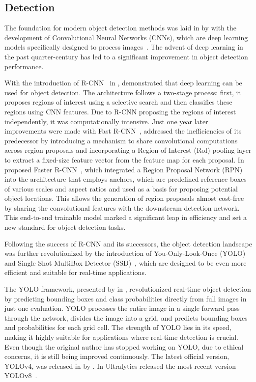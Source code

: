 \subsection{Detection}\label{subsec:milestone_detection}
The foundation for modern object detection methods was laid in \citeyear{Lecun98} by \citeauthor{Lecun98} with the development of Convolutional Neural Networks (CNNs), which are deep learning models specifically designed to process images~\cite{Lecun98}. The advent of deep learning in the past quarter-century has led to a significant improvement in object detection performance.

With the introduction of R-CNN~\cite{Girshick14} in \citeyear{Girshick14}, \citeauthor{Girshick14} demonstrated that deep learning can be used for object detection. The architecture follows a two-stage process: first, it proposes regions of interest using a selective search and then classifies these regions using CNN features. Due to R-CNN proposing the regions of interest independently, it was computationally intensive. Just one year later improvements were made with Fast R-CNN~\cite{Girshick15}, addressed the inefficiencies of its predecessor by introducing a mechanism to share convolutional computations across region proposals and incorporating a Region of Interest (RoI) pooling layer to extract a fixed-size feature vector from the feature map for each proposal. In \citeyear{Ren17} \citeauthor{Ren17} proposed Faster R-CNN~\cite{Ren17}, which integrated a Region Proposal Network (RPN) into the architecture that employs anchors, which are predefined reference boxes of various scales and aspect ratios and used as a basis for proposing potential object locations. This allows the generation of region proposals almost cost-free by sharing the convolutional features with the downstream detection network. This end-to-end trainable model marked a significant leap in efficiency and set a new standard for object detection tasks.

Following the success of R-CNN and its successors, the object detection landscape was further revolutionized by the introduction of You-Only-Look-Once (YOLO)~\cite{Redmon15} and Single Shot MultiBox Detector (SSD)~\cite{Liu15}, which are designed to be even more efficient and suitable for real-time applications.

The YOLO framework, presented by \citeauthor{Redmon15} in \citeyear{Redmon15}, revolutionized real-time object detection by predicting bounding boxes and class probabilities directly from full images in just one evaluation. YOLO processes the entire image in a single forward pass through the network, divides the image into a grid, and predicts bounding boxes and probabilities for each grid cell. The strength of YOLO lies in its speed, making it highly suitable for applications where real-time detection is crucial. Even though the original author has stopped working on YOLO, due to ethical concerns, it is still being improved continuously. The latest official version, YOLOv4, was released in \citeyear{Bochkovskiy20} by \textcite{Bochkovskiy20}. In \citeyear{Jocher23a} Ultralytics released the most recent version YOLOv8~\cite{Jocher23a, Jocher23b}.

